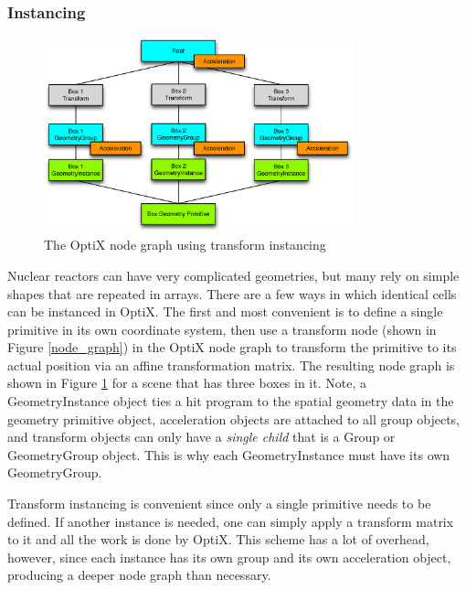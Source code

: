 \subsubsection{Instancing}

\begin{figure}[h!] 
  \centering
    \includegraphics[width=0.8\textwidth]{graphics/transform_instancing.eps}
     \caption{The OptiX node graph using transform instancing \label{transform_instancing} }
\end{figure}

Nuclear reactors can have very complicated geometries, but many rely on simple shapes that are repeated in arrays.  There are a few ways in which identical cells can be instanced in OptiX.  The first and most convenient is to define a single primitive in its own coordinate system, then use a transform node (shown in Figure \ref{node_graph}) in the OptiX node graph to transform the primitive to its actual position via an affine transformation matrix.  The resulting node graph is shown in Figure \ref{transform_instancing} for a scene that has three boxes in it.  Note, a GeometryInstance object ties a hit program to the spatial geometry data in the geometry primitive object, acceleration objects are attached to all group objects, and transform objects can only have a \emph{single child} that is a Group or GeometryGroup object.  This is why each GeometryInstance must have its own GeometryGroup.

Transform instancing is convenient since only a single primitive needs to be defined.  If another instance is needed, one can simply apply a transform matrix to it and all the work is done by OptiX.  This scheme has a lot of overhead, however, since each instance has its own group and its own acceleration object, producing a deeper node graph than necessary.

